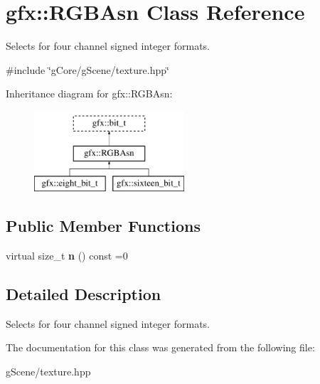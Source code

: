 \hypertarget{classgfx_1_1RGBAsn}{\section{gfx\-:\-:R\-G\-B\-Asn Class Reference}
\label{classgfx_1_1RGBAsn}
}


Selects for four channel signed integer formats.  




{\ttfamily \#include \char`\"{}g\-Core/g\-Scene/texture.\-hpp\char`\"{}}

Inheritance diagram for gfx\-:\-:R\-G\-B\-Asn\-:\begin{figure}[H]
\begin{center}
\leavevmode
\includegraphics[height=3.000000cm]{classgfx_1_1RGBAsn}
\end{center}
\end{figure}
\subsection*{Public Member Functions}
\begin{DoxyCompactItemize}
\item 
\hypertarget{classgfx_1_1RGBAsn_ae38a51cd1ae1705fb3ad291240b6fff5}{virtual size\-\_\-t {\bfseries n} () const =0}\label{classgfx_1_1RGBAsn_ae38a51cd1ae1705fb3ad291240b6fff5}

\end{DoxyCompactItemize}


\subsection{Detailed Description}
Selects for four channel signed integer formats. 

The documentation for this class was generated from the following file\-:\begin{DoxyCompactItemize}
\item 
g\-Scene/texture.\-hpp\end{DoxyCompactItemize}
